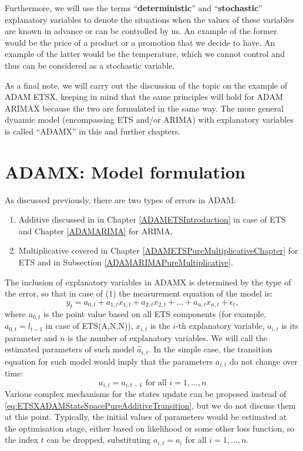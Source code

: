 \documentclass[]{book}
\providecommand{\tightlist}{%
  \setlength{\itemsep}{0pt}\setlength{\parskip}{0pt}}
\theoremstyle{definition}
\theoremstyle{definition}
\theoremstyle{definition}
\theoremstyle{definition}
\theoremstyle{remark}
\begin{document}
Furthermore, we will use the terms ``\textbf{deterministic}'' and ``\textbf{stochastic}'' explanatory variables to denote the situations when the values of these variables are known in advance or can be controlled by us. An example of the former would be the price of a product or a promotion that we decide to have. An example of the latter would be the temperature, which we cannot control and thus can be considered as a stochastic variable.

As a final note, we will carry out the discussion of the topic on the example of ADAM ETSX, keeping in mind that the same principles will hold for ADAM ARIMAX because the two are formulated in the same way. The more general dynamic model (encompassing ETS and/or ARIMA) with explanatory variables is called ``ADAMX'' in this and further chapters.

\hypertarget{ADAMXFormulation}{%
\section{ADAMX: Model formulation}\label{ADAMXFormulation}}

As discussed previously, there are two types of errors in ADAM:

\begin{enumerate}
\def\labelenumi{\arabic{enumi}.}
\tightlist
\item
  Additive discussed in \citet{Hyndman2008b} in Chapter \ref{ADAMETSIntroduction} in case of ETS and Chapter \ref{ADAMARIMA} for ARIMA,
\item
  Multiplicative covered in Chapter \ref{ADAMETSPureMultiplicativeChapter} for ETS and in Subsection \ref{ADAMARIMAPureMultiplicative}.
\end{enumerate}

The inclusion of explanatory variables in ADAMX is determined by the type of the error, so that in case of (1) the measurement equation of the model is:
\begin{equation}
  {y}_{t} = a_{0,t} + a_{1,t} x_{1,t} + a_{2,t} x_{2,t} + \dots + a_{n,t} x_{n,t} + \epsilon_t ,
  \label{eq:ETSXADAMStateSpacePureAdditiveMeasurement}
\end{equation}
where \(a_{0,t}\) is the point value based on all ETS components (for example, \(a_{0,t}=l_{t-1}\) in case of ETS(A,N,N)), \(x_{i,t}\) is the \(i\)-th explanatory variable, \(a_{i,t}\) is its parameter and \(n\) is the number of explanatory variables. We will call the estimated parameters of such model \(\hat{a}_{i,t}\). In the simple case, the transition equation for such model would imply that the parameters \(a_{i,t}\) do not change over time:
\begin{equation}
    a_{i,t} = a_{i,t-1} \text{ for all } i = 1, \dots, n
  \label{eq:ETSXADAMStateSpacePureAdditiveTransition}
\end{equation}
Various complex mechanisms for the states update can be proposed instead of \eqref{eq:ETSXADAMStateSpacePureAdditiveTransition}, but we do not discuss them at this point. Typically, the initial values of parameters would be estimated at the optimisation stage, either based on likelihood or some other loss function, so the index \(t\) can be dropped, substituting \(a_{i,t}=a_{i}\) for all \(i=1,\dots,n\).
\end{document}
